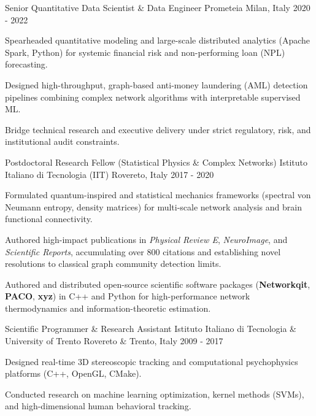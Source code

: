 \documentclass[11pt, a4paper]{awesome-cv}
\begin{document}
\begin{cventries}
\cventry
{Senior Quantitative Data Scientist \& Data Engineer} {Prometeia} {Milan, Italy} {2020 - 2022} { \begin{cvitems}
\item{Spearheaded quantitative modeling and large-scale distributed analytics (Apache Spark, Python) for systemic financial risk and non-performing loan (NPL) forecasting.}
\item{Designed high-throughput, graph-based anti-money laundering (AML) detection pipelines combining complex network algorithms with interpretable supervised ML.}
\item{Bridge technical research and executive delivery under strict regulatory, risk, and institutional audit constraints.}
\end{cvitems}
}

\cventry
{Postdoctoral Research Fellow (Statistical Physics \& Complex Networks)} {Istituto Italiano di Tecnologia (IIT)} {Rovereto, Italy} {2017 - 2020} { \begin{cvitems}
\item{Formulated quantum-inspired and statistical mechanics frameworks (spectral von Neumann entropy, density matrices) for multi-scale network analysis and brain functional connectivity.}
\item{Authored high-impact publications in \textit{Physical Review E}, \textit{NeuroImage}, and \textit{Scientific Reports}, accumulating over 800 citations and establishing novel resolutions to classical graph community detection limits.}
\item{Authored and distributed open-source scientific software packages (\textbf{Networkqit}, \textbf{PACO}, \textbf{xyz}) in C++ and Python for high-performance network thermodynamics and information-theoretic estimation.}
\end{cvitems}
}

\cventry
{Scientific Programmer \& Research Assistant} {Istituto Italiano di Tecnologia \& University of Trento} {Rovereto \& Trento, Italy} {2009 - 2017} { \begin{cvitems}
\item{Designed real-time 3D stereoscopic tracking and computational psychophysics platforms (C++, OpenGL, CMake).}
\item{Conducted research on machine learning optimization, kernel methods (SVMs), and high-dimensional human behavioral tracking.}
\end{cvitems}
}

\end{cventries} 
\end{document}
